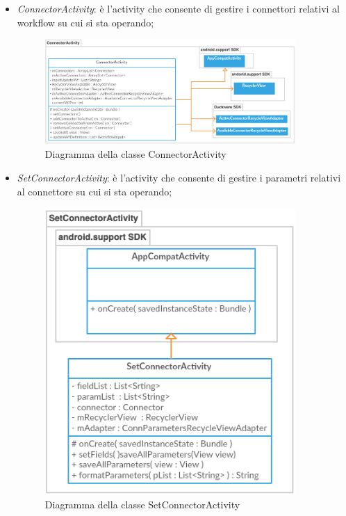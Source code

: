 \begin{itemize}
    \item \emph{ConnectorActivity}: è l'activity che consente di gestire i connettori relativi al workflow su cui si sta operando;
        \begin{figure}[H]
	    \begin{center}
		\includegraphics[width=0.9\textwidth, keepaspectratio]{../includes/pics/connectoractivity.png}
		\caption{Diagramma della classe ConnectorActivity}
	    \end{center}
        \end{figure}
    
    
     \item \emph{SetConnectorActivity}: è l'activity che consente di gestire i parametri relativi al connettore su cui si sta operando;
        \begin{figure}[H]
	    \begin{center}
		\includegraphics[width=0.9\textwidth, keepaspectratio]{../includes/pics/setconnectoractivity.png}
		\caption{Diagramma della classe SetConnectorActivity}
	    \end{center}
        \end{figure}   
\end{itemize}

